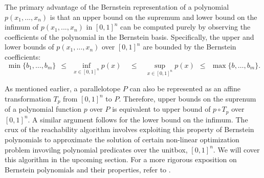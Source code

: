 The primary advantage of the Bernstein representation of a polynomial $p(x_1,...,x_n)$ is that an upper bound on the supremum and lower bound on the infimum of $p(x_1,...,x_n)$ in $[0,1]^{n}$ can be computed purely by observing the coefficients of the polynomial in the Bernstein basis. Specifically, the upper and lower bounds of $p(x_1,\ldots,x_n)$ over $[0,1]^n$ are bounded by the Bernstein coefficients:
$$
\min \{b_1, \ldots, b_m\} ~~\leq~~ \inf_{x \in [0,1]^n} p(x) ~~~~~\leq~~~~ \sup_{x \in [0,1]^{n}} p(x) ~~\leq~~ \max \{b, \ldots, b_m\}.
$$

As mentioned earlier, a parallelotope $P$ can also be represented as an affine transformation $T_{p}$ from $[0,1]^{n}$ to $P$.
%
Therefore, upper bounds on the suprenum of a polynomial function $p$ over $P$ is equivalent to upper bound of $p \circ T_{p}$ over $[0,1]^{n}$.
%
A similar argument follows for the lower bound on the infimum.
%
The crux of the reachability algorithm involves exploiting this property of Bernstein polynomials to approximate the solution of certain non-linear optimization problem invovilng polynomial predicates over the unitbox, $[0,1]^n$.
%
We will cover this algorithm in the upcoming section.
%
For a more rigorous exposition on Bernstein polynomials and their properties, refer to \cite{garloff2003bernstein}.


